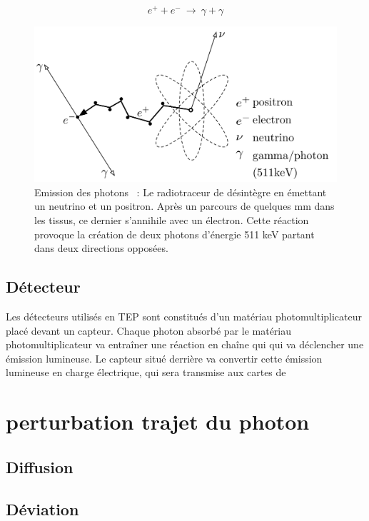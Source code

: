 \begin{equation}
 e^+ + e^-~\rightarrow~\gamma + \gamma
\label{eq:annihilation}
\end{equation}

\begin{figure}
\centering
\includegraphics[width=12cm]{images/annihilation}
\caption[\'Emission des photons]{Emission des photons~\cite{Langner2008ad} : Le radiotraceur de désintègre en émettant un neutrino et un positron. Après un parcours de quelques mm dans les tissus, ce dernier s'annihile avec un électron. Cette réaction provoque la création de deux photons d'énergie 511 keV partant dans deux directions opposées.}
\label{fig:Langner2008ad}
\end{figure}



	\subsection{Détecteur}

Les détecteurs utilisés en TEP sont constitués d'un matériau photomultiplicateur placé devant un capteur. Chaque photon absorbé par le matériau photomultiplicateur va entraîner une réaction en chaîne qui qui va déclencher une émission lumineuse. Le capteur situé derrière va convertir cette émission lumineuse en charge électrique, qui sera transmise aux cartes de 

	\section{perturbation trajet du photon}

		\subsection{Diffusion}

		
		\subsection{Déviation}

